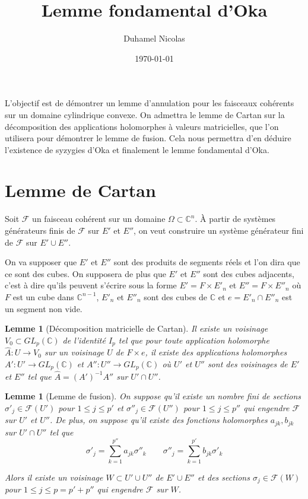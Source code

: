 \documentclass{article}
\newtheorem{lemme}[theoreme]{Lemme}
\theoremstyle{definition}
\theoremstyle{remarque}
\begin{document}
\title{Lemme fondamental d'Oka}
\date \today
\author{Duhamel Nicolas}
\maketitle

L'objectif est de démontrer un lemme d'annulation pour les faisceaux cohérents sur un domaine cylindrique convexe. On admettra le lemme de Cartan sur la décomposition des applications holomorphes à valeurs matricielles, que l'on utilisera pour démontrer le lemme de fusion. Cela nous permettra d'en déduire l'existence de syzygies d'Oka et finalement le lemme fondamental d'Oka.

\section{Lemme de Cartan}
Soit $\mathcal{F}$ un faisceau cohérent sur un domaine $\Omega \subset \mathbb{C}^n$. À partir de systèmes générateurs finis de $\mathcal{F}$ sur $E'$ et $E''$, on veut construire un système générateur fini de $\mathcal{F}$ sur $E' \cup E''$.

On va supposer que $E'$ et $E''$ sont des produits de segments réels et l'on dira que ce sont des cubes. On supposera de plus que $E'$ et $E''$ sont des cubes adjacents, c'est à dire qu'ils peuvent s'écrire sous la forme $E'=F \times E'_n$ et $E''=F \times E''_n$ où $F$ est un cube dans $\mathbb{C}^{n-1}$, $E'_n$ et $E''_n$ sont des cubes de $\mathbb{C}$ et $e=E'_n \cap E''_n$ est un segment non vide.

\begin{lemme}[Décomposition matricielle de Cartan]
Il existe un voisinage $V_0 \subset GL_p(\mathbb{C})$ de l'identité $I_p$ tel que pour toute application holomorphe $\hat{A} : U \to V_0$ sur un voisinage $U$ de $F \times e$, il existe des applications holomorphes $A' : U' \to GL_p(\mathbb{C})$ et $A'' : U'' \to GL_p(\mathbb{C})$ où $U'$ et $U''$ sont des voisinages de $E'$ et $E''$ tel que $\hat{A} = (A')^{-1}A''$ sur $U' \cap U''$.
\end{lemme}

\begin{lemme}[Lemme de fusion]
On suppose qu'il existe un nombre fini de sections $\sigma'_j \in \mathcal{F}(U')$ pour $1\leq j \leq p'$ et $\sigma''_j \in \mathcal{F}(U'')$ pour $1\leq j \leq p''$ qui engendre $\mathcal{F}$ sur $U'$ et $U''$. De plus, on suppose qu'il existe des fonctions holomorphes $a_{jk}, b_{jk}$ sur $U' \cap U''$ tel que
\begin{equation*}
\sigma'_j = \sum_{k=1}^{p''} a_{jk}\sigma''_k \qquad
\sigma''_j = \sum_{k=1}^{p'} b_{jk}\sigma'_k
\end{equation*}

Alors il existe un voisinage $W \subset U' \cup U''$ de $E' \cup E''$ et des sections $\sigma_j \in \mathcal{F}(W)$ pour $1\leq j \leq p=p'+p''$ qui engendre $\mathcal{F}$ sur $W$.
\end{lemme}
\end{document}
